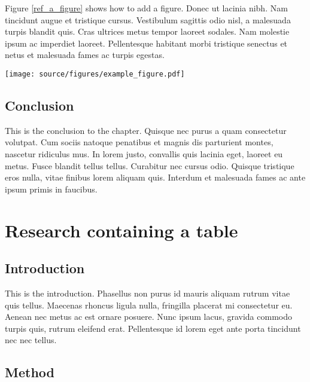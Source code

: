 \documentclass[11pt,letterpaper,]{article}
\let\origfigure=\figure
\let\endorigfigure=\endfigure
\renewenvironment{figure}[1][]{%
\origfigure[b]
}{%
\endorigfigure
}
\begin{document}
Figure \ref{ref_a_figure} shows how to add a figure. Donec ut lacinia
nibh. Nam tincidunt augue et tristique cursus. Vestibulum sagittis odio
nisl, a malesuada turpis blandit quis. Cras ultrices metus tempor
laoreet sodales. Nam molestie ipsum ac imperdiet laoreet. Pellentesque
habitant morbi tristique senectus et netus et malesuada fames ac turpis
egestas.

\begin{figure}[htbp]
\centering
\texttt{[image: source/figures/example\_figure.pdf]}
\caption{RV Calypso is a former British Royal Navy minesweeper converted
into a research vessel for the oceanographic researcher Jacques-Yves
Cousteau. It was equipped with a mobile laboratory for underwater field
research. \label{ref_a_figure}}
\end{figure}

\subsection{Conclusion}\label{conclusion-2}

This is the conclusion to the chapter. Quisque nec purus a quam
consectetur volutpat. Cum sociis natoque penatibus et magnis dis
parturient montes, nascetur ridiculus mus. In lorem justo, convallis
quis lacinia eget, laoreet eu metus. Fusce blandit tellus tellus.
Curabitur nec cursus odio. Quisque tristique eros nulla, vitae finibus
lorem aliquam quis. Interdum et malesuada fames ac ante ipsum primis in
faucibus.

\section{Research containing a table}\label{research-containing-a-table}

\subsection{Introduction}\label{introduction-3}

This is the introduction. Phasellus non purus id mauris aliquam rutrum
vitae quis tellus. Maecenas rhoncus ligula nulla, fringilla placerat mi
consectetur eu. Aenean nec metus ac est ornare posuere. Nunc ipsum
lacus, gravida commodo turpis quis, rutrum eleifend erat. Pellentesque
id lorem eget ante porta tincidunt nec nec tellus.

\subsection{Method}\label{method-2}
\end{document}
